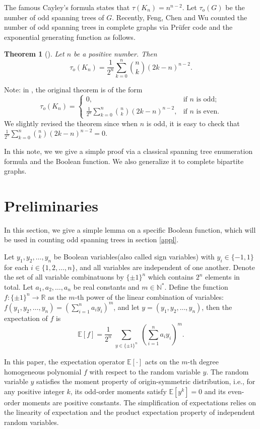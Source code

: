 \documentclass[10pt,a4paper]{article}
\newtheorem{theorem}{Theorem}[section]
\newtheorem{false statement}{False statement}
\theoremstyle{definition}
\begin{document}
The famous Cayley's formula \cite{Cayley} states that $\tau(K_n)=n^{n-2}$. 
Let $\tau_o(G)$ be the number of odd spanning trees of $G$. 
Recently, Feng, Chen and Wu counted the number of odd spanning trees in complete graphs via Prüfer code and the exponential generating function as follows. 

\begin{theorem}[\cite{FCW}]\label{Kn}
Let $n$ be a positive number. Then
$$\tau_{o}(K_{n})=\frac{1}{2^{n}}\sum_{k=0}^{n}\binom{n}{k}(2k-n)^{n-2}.$$
\end{theorem}

Note: in \cite{FCW}, the original theorem is of the form
\[
\tau_{o}(K_{n})=
\begin{cases}
0, & \text{if } n \text{ is odd;} \\
\displaystyle\frac{1}{2^{n}}\sum_{k=0}^{n}\binom{n}{k}(2k-n)^{n-2}, & \text{if } n \text{ is even.}
\end{cases}
\]
We slightly revised the theorem since when $n$ is odd, it is easy to check that $\frac{1}{2^{n}}\sum_{k=0}^{n}\binom{n}{k}(2k-n)^{n-2}=0$.

In this note, we we give a simple proof via a classical spanning tree enumeration formula and the Boolean function. 
We also generalize it to complete bipartite graphs.


\section{Preliminaries}

In this section, we give a simple lemma on a specific Boolean function, which will be used in counting odd spanning trees in section \ref{appl}.

Let $y_1,y_2,\dots,y_n$ be Boolean variables(also called sign variables) with $y_i\in\{-1,1\}$ for each $i\in\{1,2,\dots,n\}$, and all variables are independent of one another. Denote the set of all variable combinatuons by $\{\pm1\}^n$ which contains $2^n$ elements in total. Let $a_1,a_2,\dots,a_n$ be real constants and $m\in{\mathbb{N}^\ast}$. Define the function $f: \{\pm1\}^n \to \mathbb{R}$ as the $m$-th power of the linear combination of variables:
	$f(y_1,y_2,\dots,y_n)=(\sum_{i=1}^{n}a_iy_i)^m$, and let $y=(y_1, y_2, \ldots, y_n)$, then the expectation of $f$ is 
$$
	\mathbb{E}[f] = \frac{1}{2^n} \sum_{\substack{y \in \{\pm1\}^n}} \left( \sum_{i=1}^n a_i y_i \right)^m.
$$

In this paper, the expectation operator $\mathbb{E}[\cdot]$ acts on the $m$-th degree homogeneous polynomial $f$ with respect to the random variable $y$. The random variable $y$ satisfies the moment property of origin-symmetric distribution, i.e., for any positive integer $k$, its odd-order moments satisfy $\mathbb{E}[y^k]=0$ and its even-order moments are positive constants. The simplification of expectations relies on the linearity of expectation and the product expectation property of independent random variables.
\end{document}
